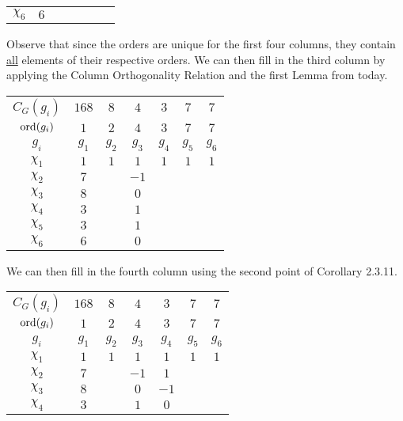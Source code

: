 \begin{boxexample}[Constructing the Character Table of $G = \PSL{2, 7}$]
\begin{table}[H]
\begin{tabular}{|c|cccccc|}
            $\chi_6$ & $6$ & & & & & \\
        \end{tabular}
    \end{table}
    Observe that since the orders are unique for the first four columns, they contain \underline{all} elements of their respective orders. We can then fill in the third column by applying the Column Orthogonality Relation and the first Lemma from today. %
    \begin{table}[H]
        \centering
        \begin{tabular}{|c|cccccc|}
            $C_G(g_i)$ & $168$ & $8$ & $4$ & $3$ & $7$ & $7$ \\
            $\operatorname{ord}\!\left( g_i \right)$ & $1$ & $2$ & $4$ & $3$ & $7$ & $7$ \\
            $g_i$ & $g_1$ & $g_2$ & $g_3$ & $g_4$ & $g_5$ & $g_6$ \\
            \hline
            $\chi_1$ & $1$ & $1$ & $1$ & $1$ & $1$ & $1$ \\
            $\chi_2$ & $7$ & & $-1$ & & & \\
            $\chi_3$ & $8$ & & $0$ & & & \\
            $\chi_4$ & $3$ & & $1$ & & & \\
            $\chi_5$ & $3$ & & $1$ & & & \\
            $\chi_6$ & $6$ & & $0$ & & & \\
        \end{tabular}
    \end{table}
    We can then fill in the fourth column using the second point of Corollary 2.3.11. %
    \begin{table}[H]
        \centering
        \begin{tabular}{|c|cccccc|}
            $C_G(g_i)$ & $168$ & $8$ & $4$ & $3$ & $7$ & $7$ \\
            $\operatorname{ord}\!\left( g_i \right)$ & $1$ & $2$ & $4$ & $3$ & $7$ & $7$ \\
            $g_i$ & $g_1$ & $g_2$ & $g_3$ & $g_4$ & $g_5$ & $g_6$ \\
            \hline
            $\chi_1$ & $1$ & $1$ & $1$ & $1$ & $1$ & $1$ \\
            $\chi_2$ & $7$ & & $-1$ & $1$ & & \\
            $\chi_3$ & $8$ & & $0$ & $-1$ & & \\
            $\chi_4$ & $3$ & & $1$ & $0$ & & \\

\end{tabular}
\end{table}
\end{boxexample}
